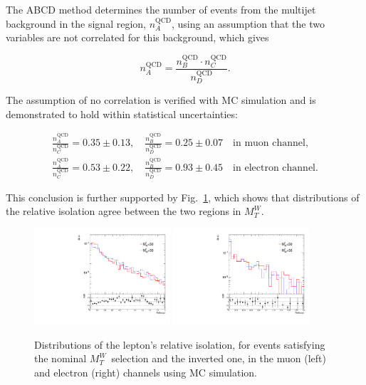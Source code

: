 The ABCD method determines the number of events from the multijet background in the signal region, $n_A^\text{QCD}$, using an assumption that the two variables are not correlated for this background, which gives
\begin{linenomath}
\begin{equation}
  n_{A}^\text{QCD} = \frac{n_{B}^\text{QCD} \cdot n_{C}^\text{QCD}}{n_{D}^\text{QCD}}.
  \label{Eq:ABCD_formula}
\end{equation}
\end{linenomath}
The assumption of no correlation is verified with MC simulation and is demonstrated to hold within statistical uncertainties:
\begin{linenomath}
\begin{equation*}
\begin{gathered}
  \frac{n_{A}^\text{QCD}}{n_{C}^\text{QCD}}=0.35 \pm 0.13, \quad \frac{n_{B}^\text{QCD}}{n_{D}^\text{QCD}}=0.25\pm 0.07 \quad \text{in muon channel}, \\
  \frac{n_{A}^\text{QCD}}{n_{C}^\text{QCD}}=0.53 \pm 0.22, \quad \frac{n_{B}^\text{QCD}}{n_{D}^\text{QCD}}=0.93\pm 0.45 \quad \text{in electron channel}.
\end{gathered}
\end{equation*}
\end{linenomath}
This conclusion is further supported by Fig.~\ref{Fig:RelIso_mtWcut}, which shows that distributions of the relative isolation agree between the two regions in $M_{T}^W$.

\begin{figure}
  \centering
  \includegraphics[width=0.45\textwidth]{fig/chapt6/normalisation/RelIso_mtWcut_semimu}
  \includegraphics[width=0.45\textwidth]{fig/chapt6/normalisation/RelIso_mtWcut_semie}
  \caption{Distributions of the lepton's relative isolation, for events satisfying the nominal $M_{T}^W$~selection and the inverted one, in the muon (left) and electron (right) channels using MC simulation.}
  \label{Fig:RelIso_mtWcut}
\end{figure}

